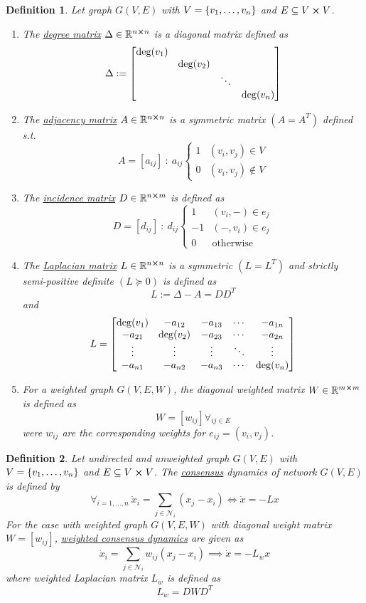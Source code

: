\documentclass[]{article}
\numberwithin{equation}{section}
\newcommand{\R}{\mathbb{R}}
\newcommand{\st}{\ : \ }
\newtheorem{definition}{Definition}
\begin{document}
\begin{definition}
	Let graph $G(V,E)$ with $V = \qty{v_1,\dots,v_n}$ and $E \subseteq V \cross V$.
	\begin{enumerate}
		\item The \underline{\emph{degree matrix}} $\Delta \in \R^{n\cross n}$ is a diagonal matrix defined as \[
			\Delta := \mqty[\dmat{\deg(v_1), \deg(v_2), \ddots, \deg(v_n)}]
		\]
		\item The \emph{\underline{adjacency matrix}} $A \in \R^{n\cross n}$ is a symmetric matrix $(A = A^T)$ defined s.t. \[
			A = [a_{ij}] \st a_{ij} \begin{cases}
				1 &(v_i,v_j) \in V\\
				0 &(v_i,v_j) \notin V
			\end{cases}
		\]
		\item The \emph{\underline{incidence matrix}} $D \in \R^{n \cross m}$ is defined as\[
			D = [d_{ij}] \st d_{ij} \begin{cases}
				1 	&(v_i,-) \in e_{j}\\
				-1	&(-,v_i) \in e_{j}\\
				0	&\text{otherwise}
			\end{cases}
		\]
		\item The \emph{\underline{Laplacian matrix}} $L \in \R^{n \cross n}$ is a symmetric $(L = L^T)$ and strictly semi-positive definite $(L \succeq 0)$ is defined as\[
			L := \Delta - A = D D^T
		\]and\[
			L = \mqty[
				\deg(v_1)	&-a_{12}	&-a_{13}	&\cdots	&-a_{1n}\\
				-a_{21}		&\deg(v_2)	&-a_{23}	&\cdots	&-a_{2n}\\
				\vdots		&\vdots		&\vdots		&\ddots	&\vdots\\
				-a_{n1}		&-a_{n2}	&-a_{n3}	&\cdots	&\deg(v_n)
			]
		\]
		\item For a weighted graph $G(V,E,W)$, the diagonal weighted matrix $W\in \R^{m\cross m}$ is defined as\[
			W = [w_{ij}] \forall_{ij \in E}
		\]
		were $w_{ij}$ are the corresponding weights for $e_{ij} = (v_i,v_j)$.
	\end{enumerate}
\end{definition}

\begin{definition}
	Let undirected and unweighted graph $G(V,E)$ with $V = \qty{v_1,\dots,v_n}$ and $E \subseteq V \cross V$.
	The \emph{\underline{consensus}} dynamics of network $G(V,E)$ is defined by\[
		\forall_{i=1,\dots,n} \ \dot{x}_i = \sum_{j\in \mathcal{N}_i} (x_j - x_i)
		\iff \dot{x} = -L x
	\] For the case with weighted graph $G(V,E,W)$ with diagonal weight matrix $W = [w_{ij}]$, 
	\emph{\underline{weighted consensus dynamics}} are given as\[
		\dot{x}_i = \sum_{j\in\mathcal{N}_i} w_{ij} (x_j - x_i) 
		\implies \dot{x} = - L_{w} x
	\]where weighted Laplacian matrix $L_{w}$ is defined as\[
		L_{w} = D W D^T
	\]
\end{definition}
\end{document}

